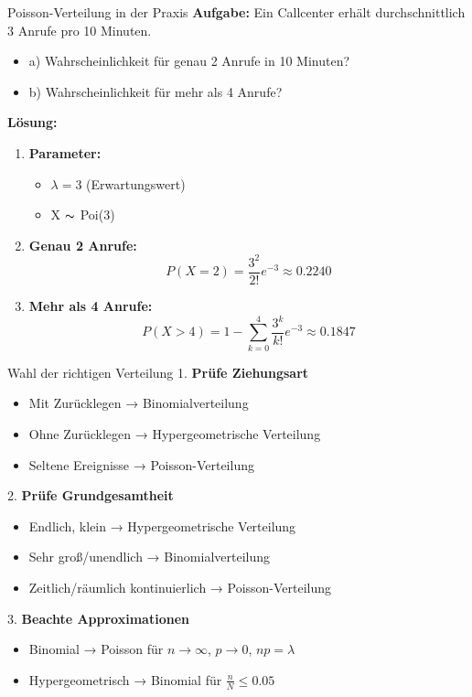 \begin{example2}{Poisson-Verteilung in der Praxis}
\textbf{Aufgabe:} Ein Callcenter erhält durchschnittlich 3 Anrufe pro 10 Minuten.
\begin{itemize}
\item a) Wahrscheinlichkeit für genau 2 Anrufe in 10 Minuten?
\item b) Wahrscheinlichkeit für mehr als 4 Anrufe?
\end{itemize}

\textbf{Lösung:}
\begin{enumerate}
\item \textbf{Parameter:}
   \begin{itemize}
   \item $\lambda = 3$ (Erwartungswert)
   \item X $\thicksim$ Poi(3)
   \end{itemize}

\item \textbf{Genau 2 Anrufe:}
   $$P(X=2) = \frac{3^2}{2!}e^{-3} \approx 0.2240$$

\item \textbf{Mehr als 4 Anrufe:}
   $$P(X>4) = 1 - \sum_{k=0}^4 \frac{3^k}{k!}e^{-3} \approx 0.1847$$
\end{enumerate}
\end{example2}

\begin{KR}{Wahl der richtigen Verteilung}
1. \textbf{Prüfe Ziehungsart}
   \begin{itemize}
   \item Mit Zurücklegen → Binomialverteilung
   \item Ohne Zurücklegen → Hypergeometrische Verteilung
   \item Seltene Ereignisse → Poisson-Verteilung
   \end{itemize}

2. \textbf{Prüfe Grundgesamtheit}
   \begin{itemize}
   \item Endlich, klein → Hypergeometrische Verteilung
   \item Sehr groß/unendlich → Binomialverteilung
   \item Zeitlich/räumlich kontinuierlich → Poisson-Verteilung
   \end{itemize}

3. \textbf{Beachte Approximationen}
   \begin{itemize}
   \item Binomial → Poisson für $n \to \infty$, $p \to 0$, $np = \lambda$
   \item Hypergeometrisch → Binomial für $\frac{n}{N} \leq 0.05$
   \end{itemize}
\end{KR}




